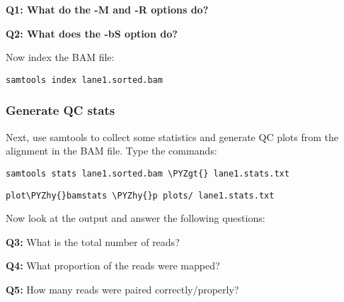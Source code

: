 \documentclass[11pt]{article}
\makeatletter
\def\PYZgt{\char`\>}
\def\PYZhy{\char`\-}
\newcommand{\boxspacing}{\kern\kvtcb@left@rule\kern\kvtcb@boxsep}
\newcommand{\prompt}[4]{
        \ttfamily\llap{{\color{#2}[#3]:\hspace{3pt}#4}}\vspace{-\baselineskip}
    }
\makeatother
\begin{document}
    \textbf{Q1: What do the -M and -R options do?}

    \textbf{Q2: What does the -bS option do?}

    Now index the BAM file:

    \begin{tcolorbox}[breakable, size=fbox, boxrule=1pt, pad at break*=1mm,colback=cellbackground, colframe=cellborder]
\prompt{In}{incolor}{ }{\boxspacing}
\begin{Verbatim}[commandchars=\\\{\}]
samtools index lane1.sorted.bam
\end{Verbatim}
\end{tcolorbox}

    \hypertarget{generate-qc-stats}{%
\subsubsection{Generate QC stats}\label{generate-qc-stats}}

Next, use samtools to collect some statistics and generate QC plots from
the alignment in the BAM file. Type the commands:

    \begin{tcolorbox}[breakable, size=fbox, boxrule=1pt, pad at break*=1mm,colback=cellbackground, colframe=cellborder]
\prompt{In}{incolor}{ }{\boxspacing}
\begin{Verbatim}[commandchars=\\\{\}]
samtools stats lane1.sorted.bam \PYZgt{} lane1.stats.txt
\end{Verbatim}
\end{tcolorbox}

    \begin{tcolorbox}[breakable, size=fbox, boxrule=1pt, pad at break*=1mm,colback=cellbackground, colframe=cellborder]
\prompt{In}{incolor}{ }{\boxspacing}
\begin{Verbatim}[commandchars=\\\{\}]
plot\PYZhy{}bamstats \PYZhy{}p plots/ lane1.stats.txt
\end{Verbatim}
\end{tcolorbox}

    Now look at the output and answer the following questions:

\textbf{Q3:} What is the total number of reads?

\textbf{Q4:} What proportion of the reads were mapped?

\textbf{Q5:} How many reads were paired correctly/properly?
\end{document}
